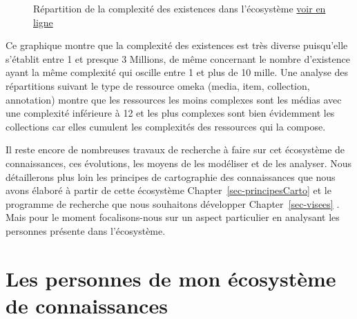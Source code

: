 \documentclass[
  a4paper,
  DIV=11,
  numbers=noendperiod]{scrreprt}
\begin{document}
\begin{figure}


\caption{\label{fig-RepartitionComplexity}Répartition de la complexité
des existences dans l'écosystème \href{jdcComplexity.html}{voir en
ligne}}

\end{figure}%

Ce graphique montre que la complexité des existences est très diverse
puisqu'elle s'établit entre 1 et presque 3 Millions, de même concernant
le nombre d'existence ayant la même complexité qui oscille entre 1 et
plus de 10 mille. Une analyse des répartitions suivant le type de
ressource omeka (media, item, collection, annotation) montre que les
ressources les moins complexes sont les médias avec une complexité
inférieure à 12 et les plus complexes sont bien évidemment les
collections car elles cumulent les complexités des ressources qui la
compose.

Il reste encore de nombreuses travaux de recherche à faire sur cet
écosystème de connaissances, ces évolutions, les moyens de les modéliser
et de les analyser. Nous détaillerons plus loin les principes de
cartographie des connaissances que nous avons élaboré à partir de cette
écosystème Chapter~\ref{sec-principesCarto} et le programme de recherche
que nous souhaitons développer Chapter~\ref{sec-visees} . Mais pour le
moment focalisons-nous sur un aspect particulier en analysant les
personnes présente dans l'écosystème.

\section{Les personnes de mon écosystème de
connaissances}\label{sec-personneEcoCon}
\end{document}
